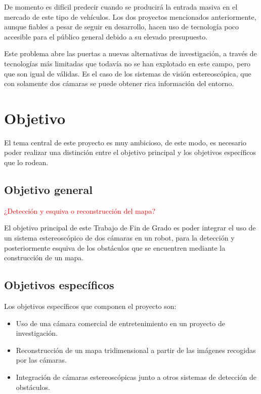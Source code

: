 De momento es difícil predecir cuando se producirá la entrada masiva en el
mercado de este tipo de vehículos. Los dos proyectos mencionados anteriormente, aunque fiables a pesar de seguir en desarrollo, hacen uso de tecnología poco
accesible para el público general debido a su elevado presupuesto.

Este problema abre las puertas a nuevas alternativas de investigación, a través
de tecnologías más limitadas que todavía no se han explotado en este campo, pero
que son igual de válidas. Es el caso de los sistemas de visión estereoscópica,
que con solamente dos cámaras se puede obtener rica información del entorno.


\section{Objetivo}
\label{1:sec:3}

El tema central de este proyecto es muy ambicioso, de este modo, es necesario
poder realizar una distinción entre el objetivo principal y los objetivos
específicos que lo rodean.

\subsection{Objetivo general}

\textcolor{red}{¿Detección y esquiva o reconstrucción del mapa?}

El objetivo principal de este Trabajo de Fin de Grado es poder integrar el uso
de un sistema estereoscópico de dos cámaras en un robot, para la detección y
posteriormente esquiva de los obstáculos que se encuentren mediante la
construcción de un mapa.

\subsection{Objetivos específicos}

Los objetivos específicos que componen el proyecto son:
\begin{itemize}
  \item Uso de una cámara comercial de entretenimiento en un proyecto de
  investigación.
  \item Reconstrucción de un mapa tridimensional a partir de las imágenes
  recogidas por las cámaras.
  \item Integración de cámaras estereoscópicas junto a otros sistemas de
  detección de obstáculos.
\end{itemize}


